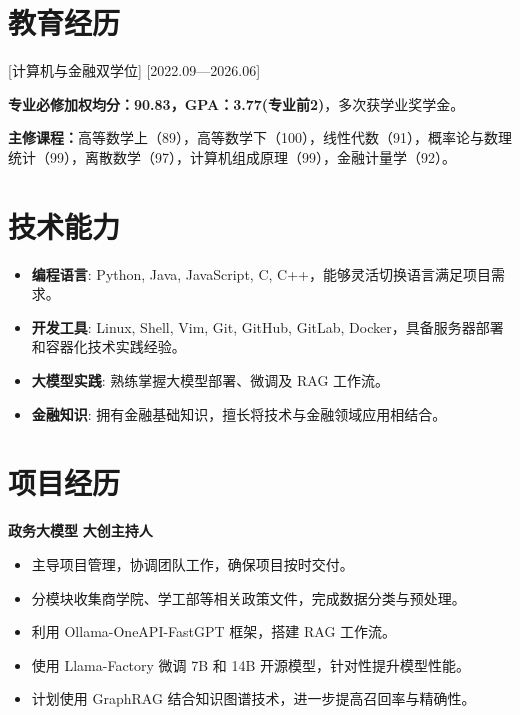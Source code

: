 \documentclass{resume}
\begin{document}

\ResumeTitle

\section{教育经历}
[\textnormal{计算机与金融双学位}]
[2022.09—2026.06]

\textbf{专业必修加权均分：90.83，GPA：3.77(专业前2)}，多次获学业奖学金。

\textbf{主修课程：}高等数学上（89），高等数学下（100），线性代数（91），概率论与数理统计（99），离散数学（97），计算机组成原理（99），金融计量学（92）。

\section{技术能力}
\begin{itemize}
    \item \textbf{编程语言}: Python, Java, JavaScript, C, C++，能够灵活切换语言满足项目需求。
    \item \textbf{开发工具}: Linux, Shell, Vim, Git, GitHub, GitLab, Docker，具备服务器部署和容器化技术实践经验。
    \item \textbf{大模型实践}: 熟练掌握大模型部署、微调及 RAG 工作流。
    \item \textbf{金融知识}: 拥有金融基础知识，擅长将技术与金融领域应用相结合。
\end{itemize}

\section{项目经历}

\textbf{政务大模型} \hfill \textbf{大创主持人}
\begin{itemize}
    \item 主导项目管理，协调团队工作，确保项目按时交付。
    \item 分模块收集商学院、学工部等相关政策文件，完成数据分类与预处理。
    \item 利用 Ollama-OneAPI-FastGPT 框架，搭建 RAG 工作流。
    \item 使用 Llama-Factory 微调 7B 和 14B 开源模型，针对性提升模型性能。
    \item 计划使用 GraphRAG 结合知识图谱技术，进一步提高召回率与精确性。
\end{itemize}
\end{document}
